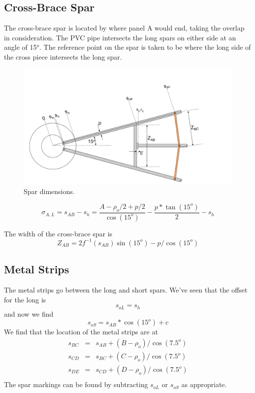 \documentclass{article}
\begin{document}
\subsection{Cross-Brace Spar}
The cross-brace spar is located by where panel A would end, taking the overlap in consideration.  The PVC pipe intersects the long spars on either side at an angle of 15$^o$.  The reference point on the spar is taken to be where the long side of the cross piece intersects the long spar.
\begin{figure}[H]
\includegraphics[width=1.0\textwidth]{spardims.pdf}
\centering
\vspace{-.15in}
\caption{Spar dimensions.}
\label{fig:spardims}
\end{figure}
\begin{equation}
\sigma_{A,L} = s_{AB} - s_h = \frac{A - \rho_o/2 + p/2}{\cos(15^o)} - \frac{p*\tan(15^o)}{2} - s_h
\end{equation}

The width of the cross-brace spar is
\begin{equation}
Z_{AB} = 2f^{-1}(s_{AB})\sin(15^o) - p/\cos(15^o)
\end{equation}

\subsection{Metal Strips}
The metal strips go between the long and short spars.  We've seen that the offset for the long is
\begin{equation}
s_{oL} = s_h
\end{equation}
and now we find
\begin{equation}
s_{oS} = s_{AB}*\cos(15^o) + c
\end{equation}
We find that the location of the metal strips are at
\begin{eqnarray}
s_{BC} & = & s_{AB} + (B - \rho_o)/\cos(7.5^o) \\
s_{CD} & = & s_{BC} + (C - \rho_o)/\cos(7.5^o) \\
s_{DE} & = & s_{CD} + (D - \rho_o)/\cos(7.5^o) \\
\end{eqnarray}
The spar markings can be found by subtracting $s_{oL}$ or $s_{oS}$ as appropriate.
\end{document}
